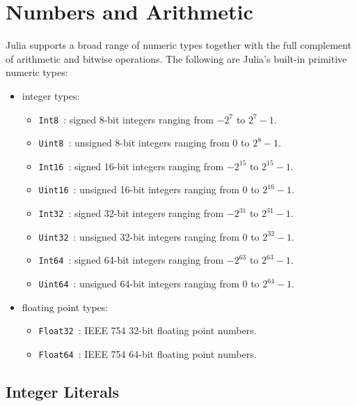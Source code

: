 \documentclass{article}
\begin{document}
\section{Numbers and Arithmetic}
Julia supports a broad range of numeric types together with the full complement of arithmetic and bitwise operations.
The following are Julia's built-in primitive numeric types:

\begin{itemize}
  \item integer types:
  \begin{itemize}
    \item \verb|Int8|~: signed 8-bit integers ranging from $-2^7$ to $2^7-1$.
    \item \verb|Uint8|~: unsigned 8-bit integers ranging from 0 to $2^8-1$.
    \item \verb|Int16|~: signed 16-bit integers ranging from $-2^{15}$ to $2^{15}-1$.
    \item \verb|Uint16|~: unsigned 16-bit integers ranging from 0 to $2^{16}-1$.
    \item \verb|Int32|~: signed 32-bit integers ranging from $-2^{31}$ to $2^{31}-1$.
    \item \verb|Uint32|~: unsigned 32-bit integers ranging from 0 to $2^{32}-1$.
    \item \verb|Int64|~: signed 64-bit integers ranging from $-2^{63}$ to $2^{63}-1$.
    \item \verb|Uint64|~: unsigned 64-bit integers ranging from 0 to $2^{64}-1$.
  \end{itemize}
  \item floating point types:
  \begin{itemize}
    \item \verb|Float32|~: IEEE 754 32-bit floating point numbers.
    \item \verb|Float64|~: IEEE 754 64-bit floating point numbers.
  \end{itemize}
\end{itemize}

\subsection{Integer Literals}
\end{document}
